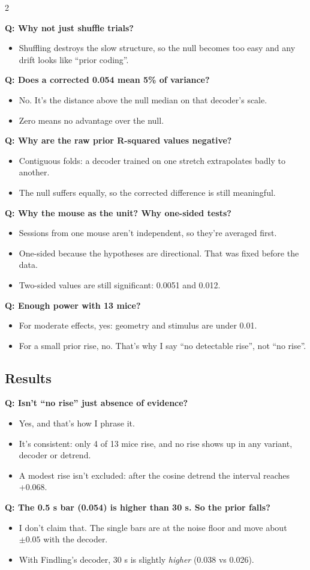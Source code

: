 \documentclass[10pt]{article}
\newcommand{\q}[2]{\par\smallskip\noindent\begin{minipage}{\linewidth}\raggedright{\bfseries\color{teal}Q: #1}\par\vspace{1pt}\begin{itemize}#2\end{itemize}\end{minipage}\par}
\begin{document}
\begin{multicols}{2}
\q{Why not just shuffle trials?}{
\item Shuffling destroys the slow structure, so the null becomes too easy and any drift looks like ``prior coding''.}

\q{Does a corrected 0.054 mean 5\% of variance?}{
\item No. It's the distance above the null median on that decoder's scale.
\item Zero means no advantage over the null.}

\q{Why are the raw prior R-squared values negative?}{
\item Contiguous folds: a decoder trained on one stretch extrapolates badly to another.
\item The null suffers equally, so the corrected difference is still meaningful.}

\q{Why the mouse as the unit? Why one-sided tests?}{
\item Sessions from one mouse aren't independent, so they're averaged first.
\item One-sided because the hypotheses are directional. That was fixed before the data.
\item Two-sided values are still significant: 0.0051 and 0.012.}

\q{Enough power with 13 mice?}{
\item For moderate effects, yes: geometry and stimulus are under 0.01.
\item For a small prior rise, no. That's why I say ``no detectable rise'', not ``no rise''.}

\subsection*{Results}

\q{Isn't ``no rise'' just absence of evidence?}{
\item Yes, and that's how I phrase it.
\item It's consistent: only 4 of 13 mice rise, and no rise shows up in any variant, decoder or detrend.
\item A modest rise isn't excluded: after the cosine detrend the interval reaches +0.068.}

\q{The 0.5 s bar (0.054) is higher than 30 s. So the prior falls?}{
\item I don't claim that. The single bars are at the noise floor and move about $\pm0.05$ with the decoder.
\item With Findling's decoder, 30 s is slightly \emph{higher} (0.038 vs 0.026).}


\end{multicols}
\end{document}
